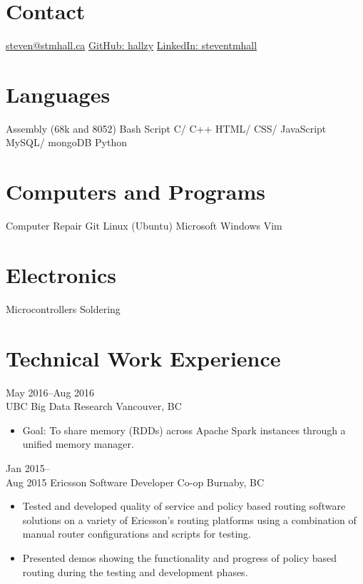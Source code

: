 \documentclass[]{friggeri-cv} %
\begin{document}


\begin{aside} %
\section{Contact}
\href{mailto:steven@stmhall.ca}{steven@stmhall.ca}
\href{http://github.com/hallzy}{GitHub: hallzy}
\href{https://www.linkedin.com/in/steventmhall}{LinkedIn: steventmhall}
\section{Languages}
Assembly (68k and 8052)
Bash Script
C/ C++
HTML/ CSS/ JavaScript
MySQL/ mongoDB
Python
\section{Computers and Programs}
Computer Repair
Git
Linux (Ubuntu)
Microsoft Windows
Vim
\section{Electronics}
Microcontrollers
Soldering
\end{aside}

\section{Technical Work Experience}

\begin{entrylist}

\entry
{May 2016--Aug 2016\\}
{UBC {\normalfont Big Data Research}}
{Vancouver, BC}
{
\begin{itemize}
\item Goal: To share memory (RDDs) across Apache Spark instances through a
unified memory manager.
\end{itemize}
}
\entry
{Jan 2015--\\Aug 2015}
{Ericsson {\normalfont Software Developer Co-op}}
{Burnaby, BC}
{
\begin{itemize}
\item Tested and developed quality of service and policy based routing software
solutions on a variety of Ericsson's routing platforms using a combination of
manual router configurations and scripts for testing.
\item Presented demos showing the functionality and progress of policy based
routing during the testing and development phases.
\end{itemize}
}
\end{entrylist}
\end{document}
